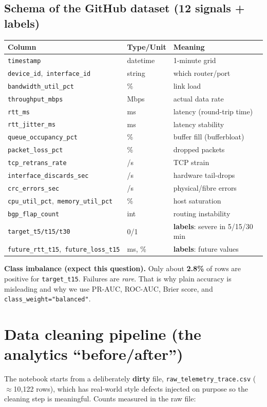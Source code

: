 \documentclass[11pt,a4paper]{article}
\newcommand{\warn}[1]{%
  \par\vspace{3pt}\noindent
  \colorbox{warnbg}{\parbox{\dimexpr\linewidth-2\fboxsep}{\small #1}}%
  \par\vspace{3pt}}
\begin{document}
\subsection{Schema of the GitHub dataset (12 signals + labels)}
\begin{center}
\begin{tabularx}{\linewidth}{@{}p{3.6cm}p{2.1cm}X@{}}
\toprule
\textbf{Column} & \textbf{Type/Unit} & \textbf{Meaning} \\
\midrule
\texttt{timestamp} & datetime & 1-minute grid \\
\texttt{device\_id},\ \texttt{interface\_id} & string & which router/port \\
\texttt{bandwidth\_util\_pct} & \% & link load \\
\texttt{throughput\_mbps} & Mbps & actual data rate \\
\texttt{rtt\_ms} & ms & latency (round-trip time) \\
\texttt{rtt\_jitter\_ms} & ms & latency stability \\
\texttt{queue\_occupancy\_pct} & \% & buffer fill (bufferbloat) \\
\texttt{packet\_loss\_pct} & \% & dropped packets \\
\texttt{tcp\_retrans\_rate} & /s & TCP strain \\
\texttt{interface\_discards\_sec} & /s & hardware tail-drops \\
\texttt{crc\_errors\_sec} & /s & physical/fibre errors \\
\texttt{cpu\_util\_pct},\ \texttt{memory\_util\_pct} & \% & host saturation \\
\texttt{bgp\_flap\_count} & int & routing instability \\
\texttt{target\_t5/t15/t30} & 0/1 & \textbf{labels}: severe in 5/15/30 min \\
\texttt{future\_rtt\_t15},\ \texttt{future\_loss\_t15} & ms, \% & \textbf{labels}: future values \\
\bottomrule
\end{tabularx}
\end{center}

\warn{\textbf{Class imbalance (expect this question).} Only about \textbf{2.8\%} of rows are positive for
\texttt{target\_t15}. Failures are \emph{rare}. That is why plain accuracy is misleading and why we use
PR-AUC, ROC-AUC, Brier score, and \texttt{class\_weight="balanced"}.}

\section{Data cleaning pipeline (the analytics ``before/after'')}
The notebook starts from a deliberately \textbf{dirty} file,
\texttt{raw\_telemetry\_trace.csv} ($\approx$10{,}122 rows), which has real-world style defects injected on
purpose so the cleaning step is meaningful. Counts measured in the raw file:
\end{document}
